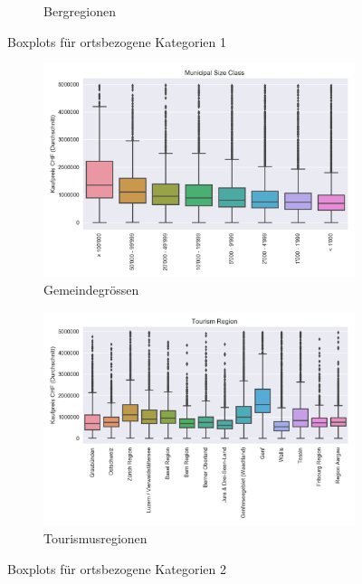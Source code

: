 \begin{figure}[h]
\begin{subfigure}{.5\textwidth}
  \caption{Bergregionen}
\end{subfigure}
\caption{Boxplots für ortsbezogene Kategorien 1}
\end{figure}

\begin{figure}[h]
\begin{subfigure}{.5\textwidth}
  \centering
  \includegraphics[width=\linewidth]{images/anhang/analysis/boxplot_municipal_size_class_id.png}
  \caption{Gemeindegrössen}
\end{subfigure}
\begin{subfigure}{.5\textwidth}
  \centering
  \includegraphics[width=\linewidth]{images/anhang/analysis/boxplot_tourism_region_id.png}
  \caption{Tourismusregionen}
\end{subfigure}
\caption{Boxplots für ortsbezogene Kategorien 2}
\end{figure}

